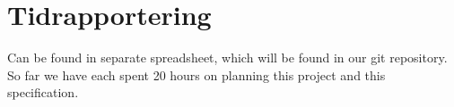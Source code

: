 \documentclass[12pt,a4paper]{article}
\begin{document}
\section{Tidrapportering}

Can be found in separate spreadsheet, which will be found in our git repository.
So far we have each spent 20 hours on planning this project and this specification.


\end{document}
